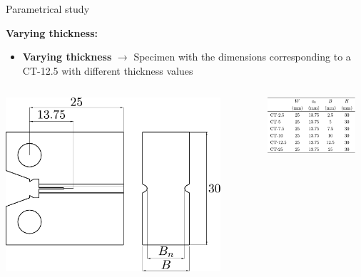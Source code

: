 \documentclass[9pt]{beamer}
\begin{document}
\begin{frame}{Parametrical study}

\textcolor{MINESBlue}{\textbf{Varying thickness:}}
\vspace{0.3cm}
\begin{itemize}
        \item \textbf{Varying thickness} $\rightarrow$ Specimen with the dimensions corresponding to a CT-12.5 with different thickness values
    \end{itemize}

    \vspace{0.5cm}

    \begin{columns}
        \centering
        \includegraphics[width=0.87\textwidth]{Images/geo_size_effect.pdf}
        
        \centering
        \includegraphics[width=0.9\textwidth]{Images/tab_size_effect.pdf}
    \end{columns}

\end{frame}
\end{document}
